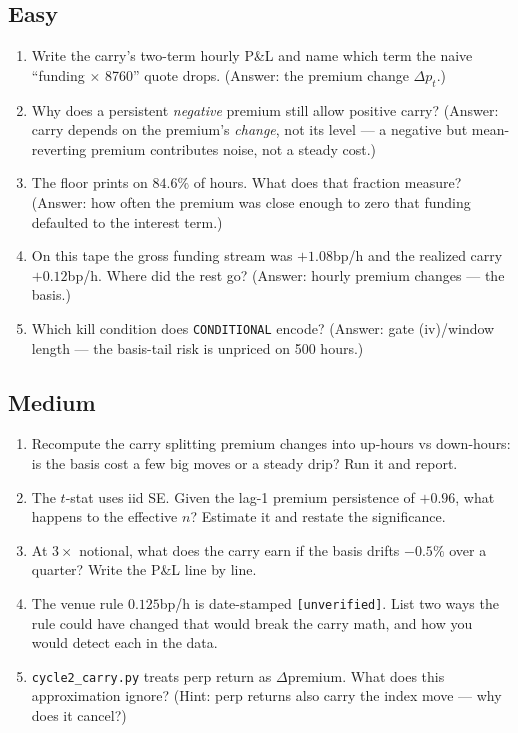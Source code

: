 \subsection*{Easy}
\begin{enumerate}
\item Write the carry's two-term hourly P\&L and name which
term the naive ``funding $\times$ 8760'' quote drops. (Answer:
the premium change $\Delta p_t$.)
\item Why does a persistent \emph{negative} premium still allow
positive carry? (Answer: carry depends on the premium's
\emph{change}, not its level --- a negative but mean-reverting
premium contributes noise, not a steady cost.)
\item The floor prints on $84.6\%$ of hours. What does that
fraction measure? (Answer: how often the premium was close
enough to zero that funding defaulted to the interest term.)
\item On this tape the gross funding stream was $+1.08$bp/h and
the realized carry $+0.12$bp/h. Where did the rest go? (Answer:
hourly premium changes --- the basis.)
\item Which kill condition does \texttt{CONDITIONAL} encode?
(Answer: gate (iv)/window length --- the basis-tail risk is
unpriced on 500 hours.)
\end{enumerate}
\subsection*{Medium}
\begin{enumerate}
\item Recompute the carry splitting premium changes into
up-hours vs down-hours: is the basis cost a few big moves or a
steady drip? Run it and report.
\item The $t$-stat uses iid SE. Given the lag-1 premium
persistence of $+0.96$, what happens to the effective $n$?
Estimate it and restate the significance.
\item At $3\times$ notional, what does the carry earn if the
basis drifts $-0.5\%$ over a quarter? Write the P\&L line by
line.
\item The venue rule $0.125$bp/h is date-stamped
\texttt{[unverified]}. List two ways the rule could have
changed that would break the carry math, and how you would
detect each in the data.
\item \texttt{cycle2\_carry.py} treats perp return as
$\Delta$premium. What does this approximation ignore? (Hint:
perp returns also carry the index move --- why does it cancel?)
\end{enumerate}

